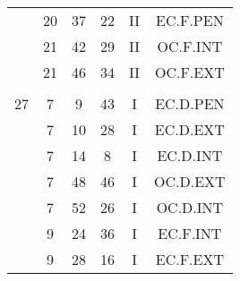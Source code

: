 \documentclass[12pt, a4paper]{article}
\begin{document}
\begin{multicols}{3}
{\begin{tabular}{c c c c c c}
	 	 	 	 & 20 & 37 & 22 & II & EC.F.PEN\\%
	 	 	 	 & 21 & 42 & 29 & II & OC.F.INT\\%
	 	 	 	 & 21 & 46 & 34 & II & OC.F.EXT\\%
	 	 	 	 & & & & & \\%
	 	 	 	27 & 7 & 9 & 43 & I & EC.D.PEN\\%
	 	 	 	 & 7 & 10 & 28 & I & EC.D.EXT\\%
	 	 	 	 & 7 & 14 & 8 & I & EC.D.INT\\%
	 	 	 	 & 7 & 48 & 46 & I & OC.D.EXT\\%
	 	 	 	 & 7 & 52 & 26 & I & OC.D.INT\\%
	 	 	 	 & 9 & 24 & 36 & I & EC.F.INT\\%
	 	 	 	 & 9 & 28 & 16 & I & EC.F.EXT\\%
	 	 \end{tabular}
 	}
\end{multicols}
\end{document}
